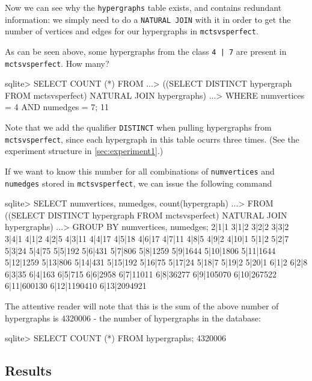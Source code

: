 Now we can see why the \texttt{hypergraphs} table exists, and contains redundant information: we simply need to do a \texttt{NATURAL JOIN} with it in order to get the number of vertices and edges for our hypergraphs in \texttt{mctsvsperfect}.

As can be seen above, some hypergraphs from the class \texttt{4 | 7} are present in \texttt{mctsvsperfect}. How many?

\begin{code}
sqlite> SELECT COUNT (*) FROM
   ...> ((SELECT DISTINCT hypergraph FROM mctsvsperfect) NATURAL JOIN hypergraphs)
   ...> WHERE numvertices = 4 AND numedges = 7;
11
\end{code}

Note that we add the qualifier \texttt{DISTINCT} when pulling hypergraphs from \texttt{mctsvsperfect}, since each hypergraph in this table ocurrs three times. (See the experiment structure in \ref{sec:experiment1}.)

If we want to know this number for all combinations of \texttt{numvertices} and \texttt{numedges} stored in \texttt{mctsvsperfect}, we can issue the following command

\begin{code}

sqlite> SELECT numvertices, numedges, count(hypergraph)
   ...> FROM ((SELECT DISTINCT hypergraph FROM mctsvsperfect) NATURAL JOIN hypergraphs)
   ...> GROUP BY numvertices, numedges;
2|1|1
3|1|2
3|2|2
3|3|2
3|4|1
4|1|2
4|2|5
4|3|11
4|4|17
4|5|18
4|6|17
4|7|11
4|8|5
4|9|2
4|10|1
5|1|2
5|2|7
5|3|24
5|4|75
5|5|192
5|6|431
5|7|806
5|8|1259
5|9|1644
5|10|1806
5|11|1644
5|12|1259
5|13|806
5|14|431
5|15|192
5|16|75
5|17|24
5|18|7
5|19|2
5|20|1
6|1|2
6|2|8
6|3|35
6|4|163
6|5|715
6|6|2958
6|7|11011
6|8|36277
6|9|105070
6|10|267522
6|11|600130
6|12|1190410
6|13|2094921

\end{code}


The attentive reader will note that this is the sum of the above number of hypergraphs is 4320006 - the number of hypergraphs in the database:

\begin{code}
sqlite> SELECT COUNT (*) FROM hypergraphs;
4320006
\end{code}


\subsection{Results}

